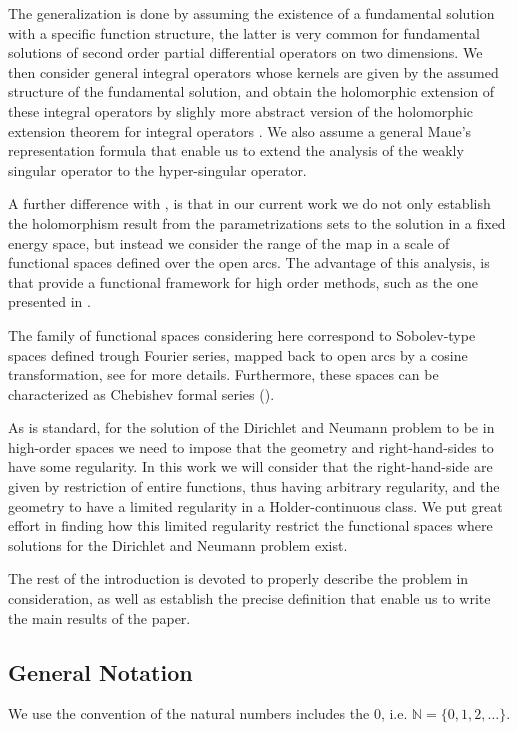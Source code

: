 \documentclass{article}
\newcommand{\IN}{{\mathbb N}}
\begin{document}
The generalization is done by assuming the existence of a fundamental solution with a specific function structure, the latter is very common for  fundamental solutions of second order partial differential operators on two dimensions. We then consider general integral operators whose kernels are given by the assumed structure of the fundamental solution, and obtain the holomorphic extension of these integral operators by  slighly more abstract version of the holomorphic extension theorem for integral operators  \cite[Theorem 3.12]{Henriquez2021}. We also assume a general Maue's representation formula that enable us to extend the analysis of the weakly singular operator to the hyper-singular operator. 

A further difference with \cite{Henriquez2021}, is that in our current work we do not only establish the holomorphism result from the parametrizations sets to the solution in a fixed energy space, but instead we consider the range of the map in a  scale of functional spaces defined over the open arcs. The advantage of this analysis, is that provide a functional  framework for high order methods, such as the one presented in \cite{JHP20}. 

The family of functional spaces considering here correspond to Sobolev-type spaces defined trough Fourier series, mapped back to open arcs by a cosine transformation, see  \cite[Chapter 11]{saranen2013periodic} for more details. Furthermore, these spaces can be characterized as Chebishev formal series (\cite{Averseng2019}). 

As is standard, for the solution of the Dirichlet and Neumann problem to be in high-order spaces we need to impose that the geometry and right-hand-sides  to have some regularity. In this work we will consider that the right-hand-side are given by restriction of entire functions, thus having arbitrary regularity, and the geometry to have a limited regularity in a Holder-continuous class. We put great effort in finding how this limited regularity restrict the functional spaces where solutions for the Dirichlet and Neumann problem exist. 

The rest of the introduction is devoted to properly describe the problem in consideration, as well as establish the precise definition that enable us to write the main results of the paper. 

\subsection{General Notation}
We use the convention of the natural numbers includes the $0$, i.e. $\IN = \{ 0,1,2,\hdots\}$. 
\end{document}

